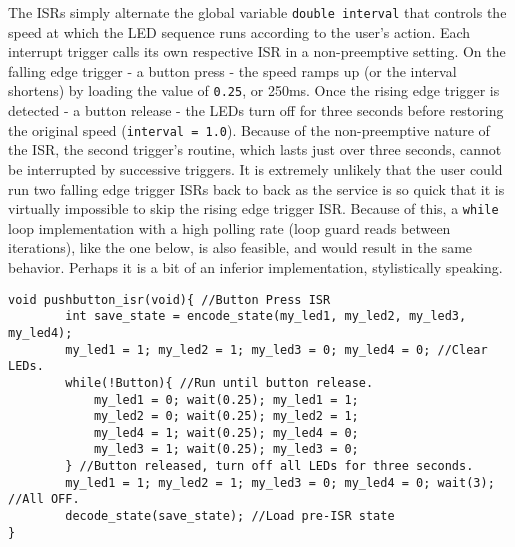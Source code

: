 \documentclass{article}
\begin{document}
The ISRs simply alternate the global variable \texttt{double interval} that controls the speed at which the LED sequence runs according to the user's action. Each interrupt trigger calls its own respective ISR in a non-preemptive setting. On the falling edge trigger - a button press - the speed ramps up (or the interval shortens) by loading the value of \texttt{0.25}, or 250ms. Once the rising edge trigger is detected - a button release - the LEDs turn off for three seconds before restoring the original speed (\texttt{interval = 1.0}). Because of the non-preemptive nature of the ISR, the second trigger's routine, which lasts just over three seconds, cannot be interrupted by successive triggers. It is extremely unlikely that the user could run two falling edge trigger ISRs back to back as the service is so quick that it is virtually impossible to skip the rising edge trigger ISR. Because of this, a \texttt{while} loop implementation with a high polling rate (loop guard reads between iterations), like the one below, is also feasible, and would result in the same behavior. Perhaps it is a bit of an inferior implementation, stylistically speaking.

\begin{verbatim}
void pushbutton_isr(void){ //Button Press ISR
        int save_state = encode_state(my_led1, my_led2, my_led3, my_led4);
        my_led1 = 1; my_led2 = 1; my_led3 = 0; my_led4 = 0; //Clear LEDs.
        while(!Button){ //Run until button release.
            my_led1 = 0; wait(0.25); my_led1 = 1;
            my_led2 = 0; wait(0.25); my_led2 = 1;
            my_led4 = 1; wait(0.25); my_led4 = 0;
            my_led3 = 1; wait(0.25); my_led3 = 0;
        } //Button released, turn off all LEDs for three seconds.
        my_led1 = 1; my_led2 = 1; my_led3 = 0; my_led4 = 0; wait(3); //All OFF.
        decode_state(save_state); //Load pre-ISR state
}
\end{verbatim}
\end{document}

